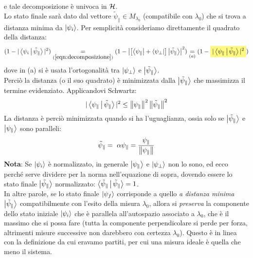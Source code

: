 \documentclass[../../FisicaTeorica.tex]{subfiles}
\begin{document}
e tale decomposizione è univoca in $\mathcal{H}$.\\
Lo stato finale sarà dato dal vettore $\tilde{\psi}_\parallel \in M_{\lambda_0}$ (compatibile con $\lambda_0$) che si trova a distanza minima da $\Ket{\psi_i}$. Per semplicità consideriamo direttamente il quadrato della distanza:
\[
(1-|\braket{\psi_i|\tilde{\psi}_\parallel}|^2)\underset{(\ref{eqn:decomposizione})}{=}
(1-\left |
\left [\bra{\psi_\parallel}+\bra{\psi_\perp} \right ]\ket{\tilde{\psi}_\parallel}
\right |^2)
\underset{(a)}{=} (1-\hlc{Yellow}{|\braket{\psi_\parallel|\tilde{\psi}_\parallel}|^2})
\]
dove in (a) si è usata l'ortogonalità tra $\Ket{\psi_\perp}$ e $\Ket{\tilde{\psi}_\parallel}$.\\
Perciò la distanza (o il suo quadrato) è minimizzata dalla $\Ket{\tilde{\psi}_\parallel}$ che massimizza il termine evidenziato. Applicandovi Schwartz:
\[
|\Braket{\psi_\parallel|\tilde{\psi}_\parallel}|^2 \leq \left\lVert\psi_\parallel\right\rVert^2 \left\lVert\tilde{\psi}_\parallel\right\rVert^2
\]
La distanza è perciò minimizzata quando si ha l'uguaglianza, ossia solo se $\Ket{\tilde{\psi}_\parallel}$ e $\Ket{\psi_\parallel}$ sono paralleli:
\[
\tilde{\psi}_\parallel =\ \alpha\psi_\parallel = \frac{\psi_\parallel}{\left\lVert\psi_\parallel\right\rVert}
\]
\textbf{Nota}: Se $\Ket{\psi_i}$ è normalizzato, in generale $\Ket{\psi_\parallel}$ e $\Ket{\psi_\perp}$ non lo sono, ed ecco perché serve dividere per la norma nell'equazione di sopra, dovendo essere lo stato finale $\Ket{\tilde{\psi}_\parallel}$ normalizzato: $\Braket{\tilde{\psi}_\parallel|\tilde{\psi}_\parallel}=1$.\\
In altre parole, se lo stato finale $\Ket{\psi_f}$ corrisponde a quello \textit{a distanza minima} $\Ket{\tilde{\psi}_\parallel}$ compatibilmente con l'esito della misura $\lambda_0$, allora si \textit{preserva} la componente dello stato iniziale $\Ket{\psi_i}$ che è parallela all'autospazio associato a $\lambda_0$, che è il massimo che si possa fare (tutta la componente perpendicolare si perde per forza, altrimenti misure successive non darebbero con certezza $\lambda_0$). Questo è in linea con la definizione da cui eravamo partiti, per cui una misura ideale è quella che  meno il sistema.\\
\end{document}
